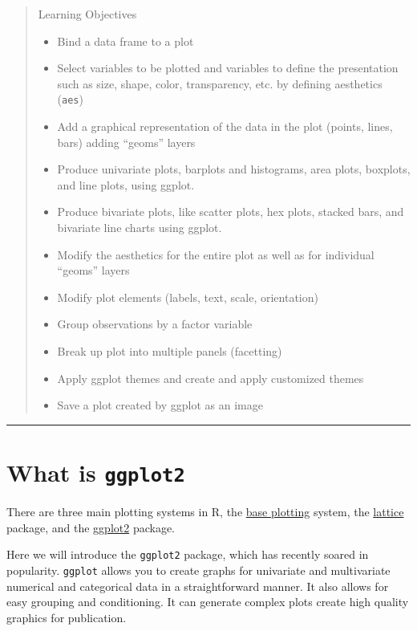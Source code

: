 \documentclass[]{book}
\providecommand{\tightlist}{%
  \setlength{\itemsep}{0pt}\setlength{\parskip}{0pt}}
\theoremstyle{definition}
\theoremstyle{definition}
\theoremstyle{definition}
\theoremstyle{remark}
\begin{document}
\begin{quote}
Learning Objectives

\begin{itemize}
\tightlist
\item
  Bind a data frame to a plot
\item
  Select variables to be plotted and variables to define the
  presentation such as size, shape, color, transparency, etc. by
  defining aesthetics (\texttt{aes})
\item
  Add a graphical representation of the data in the plot (points, lines,
  bars) adding ``geoms'' layers
\item
  Produce univariate plots, barplots and histograms, area plots,
  boxplots, and line plots, using ggplot.
\item
  Produce bivariate plots, like scatter plots, hex plots, stacked bars,
  and bivariate line charts using ggplot.
\item
  Modify the aesthetics for the entire plot as well as for individual
  ``geoms'' layers
\item
  Modify plot elements (labels, text, scale, orientation)
\item
  Group observations by a factor variable
\item
  Break up plot into multiple panels (facetting)
\item
  Apply ggplot themes and create and apply customized themes
\item
  Save a plot created by ggplot as an image
\end{itemize}
\end{quote}

\begin{center}\rule{0.5\linewidth}{\linethickness}\end{center}

\section{\texorpdfstring{What is
\textbf{\texttt{ggplot2}}}{What is ggplot2}}\label{what-is-ggplot2}

There are three main plotting systems in R, the
\href{https://www.statmethods.net/graphs/index.html}{base plotting}
system, the
\href{https://www.statmethods.net/advgraphs/trellis.html}{lattice}
package, and the
\href{https://www.statmethods.net/advgraphs/ggplot2.html}{ggplot2}
package.

Here we will introduce the \texttt{ggplot2} package, which has recently
soared in popularity. \texttt{ggplot} allows you to create graphs for
univariate and multivariate numerical and categorical data in a
straightforward manner. It also allows for easy grouping and
conditioning. It can generate complex plots create high quality graphics
for publication.
\end{document}
